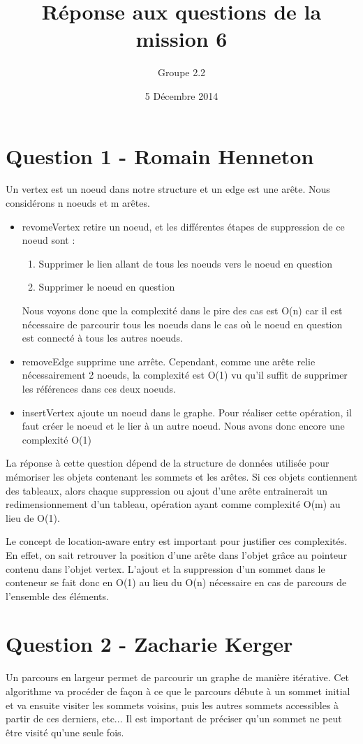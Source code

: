 \documentclass[10pt,a4paper]{article}
\date{5 Décembre 2014}
\author{Groupe 2.2}
\title{Réponse aux questions de la mission 6}
\begin{document}
\maketitle

\section*{Question 1 - Romain Henneton}
Un vertex est un noeud dans notre structure et un edge est une arête. Nous considérons n noeuds et m arêtes.
\begin{itemize}
\item revomeVertex retire un noeud, et les différentes étapes de suppression de ce noeud sont :
\begin{enumerate}
\item Supprimer le lien allant de tous les noeuds vers le noeud en question
\item Supprimer le noeud en question
\end{enumerate}
Nous voyons donc que la complexité dans le pire des cas est O(n) car il est nécessaire de parcourir tous les noeuds dans le cas où le noeud en question est connecté à tous les autres noeuds.
\item removeEdge supprime une arrête. Cependant, comme une arête relie nécessairement 2 noeuds, la complexité est O(1) vu qu'il suffit de supprimer les références dans ces deux noeuds.
\item insertVertex ajoute un noeud dans le graphe. Pour réaliser cette opération, il faut créer le noeud et le lier à un autre noeud. Nous avons donc encore une complexité O(1)
\end{itemize}

La réponse à cette question dépend de la structure de données utilisée pour mémoriser les objets contenant les sommets et les arêtes. Si ces objets contiennent des tableaux, alors chaque suppression ou ajout d'une arête entrainerait un redimensionnement d'un tableau, opération ayant comme complexité O(m) au lieu de O(1).

Le concept de location-aware entry est important pour justifier ces complexités. En effet, on sait retrouver la position d'une arête dans l'objet grâce au pointeur contenu dans l'objet vertex. L'ajout et la suppression d'un sommet dans le conteneur se fait donc en O(1) au lieu du O(n) nécessaire en cas de parcours de l'ensemble des éléments.
\section*{Question 2 - Zacharie Kerger}
Un parcours en largeur permet de parcourir un graphe de manière itérative. Cet algorithme va procéder de façon à ce que le parcours débute à un sommet initial et va ensuite visiter les sommets voisins, puis les autres sommets accessibles à partir de ces derniers, etc... Il est important de préciser qu'un sommet ne peut être visité qu'une seule fois.\\
\end{document}

